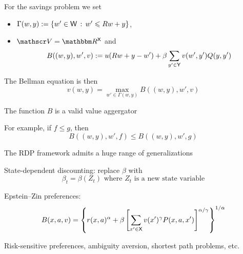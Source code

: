 \begin{frame}
    

    \Eg For the savings problem we set 
    \begin{itemize}
        \item $\Gamma(w, y) := \{w' \in \mathsf W \,:\, w' \leqslant Rw + y\}$,
        \item $\vV = \RR^\Xsf$ and
        \begin{equation*}
            B((w,y), w', v) :=
            u(R w + y - w')
            + \beta \sum_{y' \in \mathsf Y} v(w', y') Q(y, y')
        \end{equation*}
    \end{itemize}

    The Bellman equation is then 
    $$v(w, y) = \max_{w' \in \Gamma(w, y)} B((w, y), w', v)$$

    The function $B$ is a valid value aggergator

    For example, if $f \leq g$, then
    \begin{equation*}
        B((w,y), w', f) \leq B((w,y), w', g)
    \end{equation*}

\end{frame}


\begin{frame}
    
    The RDP framework admits a huge range of generalizations

              \vspace{0.5em}
              \vspace{0.5em}
    \Eg State-dependent discounting: replace $\beta$ with 
    \begin{equation*}
        \beta_t = \beta(Z_t)  \text{ where $Z_t$ is a new state variable}
    \end{equation*}

              \vspace{0.5em}
              \vspace{0.5em}
    \Eg Epstein--Zin preferences:
    \begin{equation*}
        B(x, a, v) =
        \left\{
            r(x, a)^\alpha + \beta 
                \left[
                    \sum_{x' \in \mathsf X} v(x')^\gamma P(x,a, x')
                \right]^{\alpha / \gamma}
        \right\}^{1/\alpha}
    \end{equation*}

              \vspace{0.5em}
    \Eg Risk-sensitive preferences, ambiguity aversion, shortest path problems, etc.
     
\end{frame}


